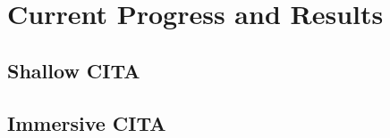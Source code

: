 \chapter[Chapter 6: Current Progress and Results]{Current Progress and Results}

\section{Shallow CITA}

\section{Immersive CITA}